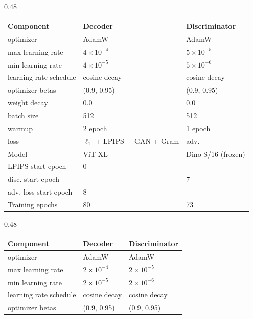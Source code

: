 \documentclass[10pt,twocolumn,letterpaper]{article}
\begin{document}
\appendix
\begin{table}[t!]
\centering

\begin{subtable}{0.48\textwidth}
\centering
\small
\begin{tabular}{lll}
\toprule
\textbf{Component} & \textbf{Decoder} & \textbf{Discriminator} \\
\midrule
optimizer                  & AdamW               & AdamW \\
max learning rate         & $4 \times 10^{-4}$  & $5 \times 10^{-5}$ \\
min learning rate         & $4 \times 10^{-5}$  & $5 \times 10^{-6}$\\
learning rate schedule     & cosine decay        & cosine decay \\
optimizer betas            & (0.9, 0.95)          & (0.9, 0.95) \\
weight decay               & 0.0                 & 0.0 \\
batch size                 & 512                 & 512 \\
warmup                     & 2 epoch            & 1 epoch \\
loss                       &{\scriptsize $\ell_1$ + LPIPS + GAN + Gram} & adv. \\
Model                       & ViT-XL& Dino-S/16 (frozen) \\
LPIPS start epoch          & 0 & -- \\
disc. start epoch    & -- &7 \\
adv. loss start epoch    & 8 & --\\
Training epochs           & 80 & 73 \\
\bottomrule
\end{tabular}
\end{subtable}
\hfill
\begin{subtable}{0.48\textwidth}
\centering
\small
\begin{tabular}{lll}
\toprule
\textbf{Component} & \textbf{Decoder} & \textbf{Discriminator} \\
\midrule
optimizer                  & AdamW               & AdamW \\
max learning rate         & $2 \times 10^{-4}$  & $2 \times 10^{-5}$ \\
min learning rate         & $2 \times 10^{-5}$  & $2 \times 10^{-6}$\\
learning rate schedule     & cosine decay        & cosine decay \\
optimizer betas            & (0.9, 0.95)          & (0.9, 0.95) \\

\end{tabular}
\end{subtable}
\end{table}
\end{document}
